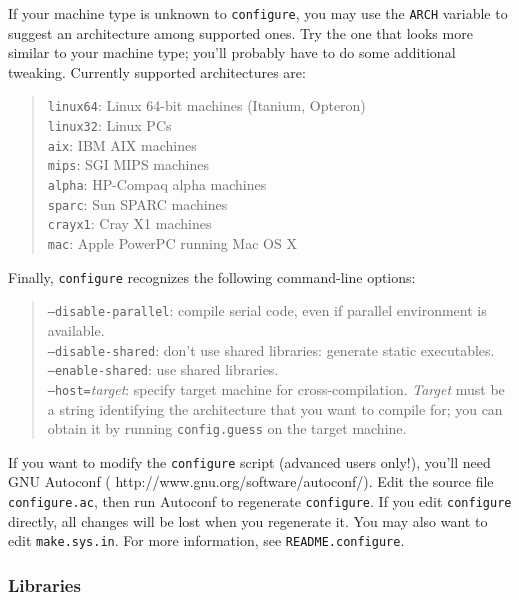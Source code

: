 \documentclass[12pt,a4paper]{article}
\begin{document}
If your machine type is unknown to \texttt{configure}, you may use the
\texttt{ARCH} variable to suggest an architecture among supported
ones.  Try the one that looks more similar to your machine type;
you'll probably have to do some additional tweaking.
Currently supported architectures are:
\begin{quote}
  \texttt{linux64}: Linux 64-bit machines (Itanium, Opteron)\\
  \texttt{linux32}: Linux PCs\\
  \texttt{aix}:     IBM AIX machines\\
  \texttt{mips}:    SGI MIPS machines\\
  \texttt{alpha}:   HP-Compaq alpha machines\\
  \texttt{sparc}:   Sun SPARC machines\\
  \texttt{crayx1}:  Cray X1 machines\\
  \texttt{mac}:     Apple PowerPC running Mac OS X
\end{quote}
Finally, \texttt{configure} recognizes the following command-line
options:
\begin{quote}
  \texttt{--disable-parallel}:
    compile serial code, even if parallel environment is available.\\
  \texttt{--disable-shared}:
    don't use shared libraries: generate static executables.\\
  \texttt{--enable-shared}:
    use shared libraries.\\
  \texttt{--host=}\emph{target}:
    specify target machine for cross-compilation.\break
    \emph{Target} must be a string identifying the architecture that
    you want to compile for; you can obtain it by running
    \texttt{config.guess} on the target machine.
\end{quote}
If you want to modify the \texttt{configure} script (advanced users
only!), you'll need GNU Autoconf
(%
                   {http://www.gnu.org/software/autoconf/}).
Edit the source file \texttt{configure.ac}, then run Autoconf to
regenerate \texttt{configure}.  If you edit \texttt{configure}
directly, all changes will be lost when you regenerate it.
You may also want to edit \texttt{make.sys.in}.
For more information, see \texttt{README.configure}.

\subsubsection{Libraries}
  \label{libraries}
\end{document}
